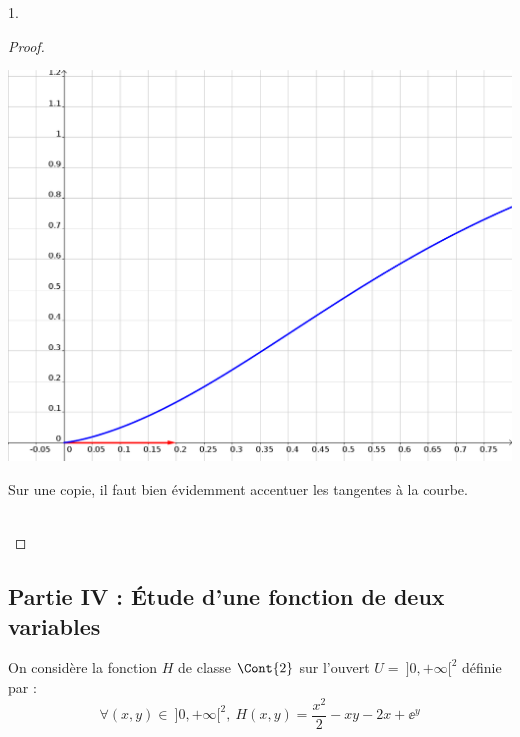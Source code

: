 \documentclass[11pt]{article}%
\begin{document}
\begin{noliste}{1.}
\begin{proof}
\begin{remark}
\begin{center}
\includegraphics[scale=1]{Figures/EML_2018/geogebra_EML_2018_zoom.png}
      \end{center}
      Sur une copie, il faut bien évidemment accentuer les tangentes 
      à la courbe.
    \end{remark}~\\[-1.4cm]
  \end{proof}
\end{noliste}


\newpage


\subsection*{Partie IV : Étude d'une fonction de deux variables}

\noindent
On considère la fonction $H$ de classe $\Cont{2}$ sur l'ouvert $U = \
]0,+\infty[^2$ définie par :
\[
  \forall (x,y) \in \ ]0,+\infty[^2, \ H(x,y) = \dfrac{x^2}{2} -xy-2x 
  + \ee^y
\]
\end{document}
